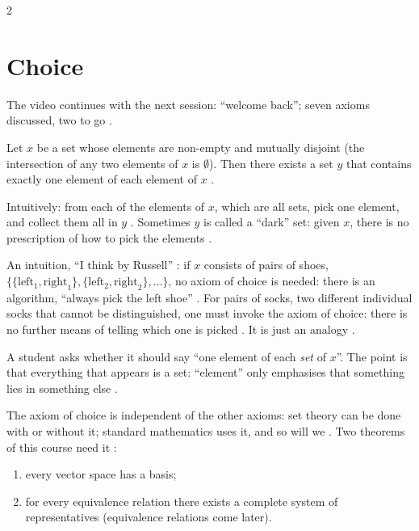 \begin{paracol}{2}
\section{Choice}\label{sec:se-choice}

The video continues with the next session: ``welcome back''; seven axioms discussed, two to go
.

\begin{definition}\label{ax:se-choice}
Let $x$ be a set whose elements are non-empty and mutually disjoint (the intersection of any two elements of $x$ is
$\emptyset$). Then there exists a set $y$ that contains exactly one element of each element of $x$
.
\end{definition}
Intuitively: from each of the elements of $x$, which are all sets, pick one element, and collect them all in $y$
. Sometimes $y$ is called a ``dark'' set: given $x$, there is no prescription of how to
pick the elements .

\begin{intuition}
An intuition, ``I think by Russell'' : if $x$ consists of pairs of shoes,
$\{\{\text{left}_1,\text{right}_1\},\{\text{left}_2,\text{right}_2\},\dots\}$, no axiom of choice is needed: there is an
algorithm, ``always pick the left shoe'' . For pairs of socks, two different individual socks that
cannot be distinguished, one must invoke the axiom of choice: there is no further means of telling which one is
picked . It is just an analogy .
\end{intuition}

A student asks whether it should say ``one element of each \emph{set} of $x$''. The point is that everything that
appears is a set: ``element'' only emphasises that something lies in something else .

\begin{remark}\label{rem:se-choice}
The axiom of choice is independent of the other axioms: set theory can be done with or without it; standard
mathematics uses it, and so will we . Two theorems of this course need it
:
\begin{enumerate}
  \item every vector space has a basis;
  \item for every equivalence relation there exists a complete system of representatives (equivalence relations
        come later).
\end{enumerate}
\end{remark}


\end{paracol}
